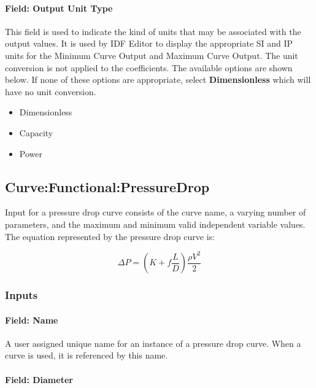 \paragraph{Field: Output Unit Type}\label{field-output-unit-type-10}

This field is used to indicate the kind of units that may be associated with the output values. It is used by IDF Editor to display the appropriate SI and IP units for the Minimum Curve Output and Maximum Curve Output. The unit conversion is not applied to the coefficients. The available options are shown below. If none of these options are appropriate, select \textbf{Dimensionless} which will have no unit conversion.

\begin{itemize}
\item
  Dimensionless
\item
  Capacity
\item
  Power
\end{itemize}

\subsection{Curve:Functional:PressureDrop}\label{curvefunctionalpressuredrop}

Input for a pressure drop curve consists of the curve name, a varying number of parameters, and the maximum and minimum valid independent variable values. The equation represented by the pressure drop curve is:

\begin{equation}
\Delta P = \left( {K + f\frac{L}{D}} \right)\frac{{\rho {V^2}}}{2}
\end{equation}

\subsubsection{Inputs}\label{inputs-11-010}

\paragraph{Field: Name}\label{field-name-11-009}

A user assigned unique name for an instance of a pressure drop curve. When a curve is used, it is referenced by this name.

\paragraph{Field: Diameter}\label{field-diameter-000}

